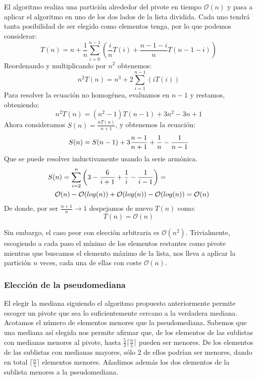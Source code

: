 \documentclass[a4paper, 11pt]{article} %
\begin{document}
      El algoritmo realiza una partición alrededor del pivote en tiempo $\mathcal{O}(n)$ y pasa a aplicar el algoritmo
      en uno de los dos lados de la lista dividida. Cada uno tendrá tanta posibilidad de ser elegido como elementos tenga,
      por lo que podemos considerar:
      \begin{equation}
	T(n) = n + \frac{1}{n}\sum_{i=0}^{n-1}\left( \frac{i}{n}T(i) + \frac{n-1-i}{n}T(n-1-i) \right)
      \end{equation}
      Reordenando y multiplicando por $n^2$ obtenemos:
      \begin{equation}
        n^2T(n) = n^3 + 2\sum^{n-1}_{i=1} \left( i T(i) \right)
      \end{equation}
      Para resolver la ecuación no homogénea, evaluamos en $n-1$ y restamos, obteniendo:
      \begin{equation}
        n^2T(n) = (n^2-1)T(n-1) + 3n^2 - 3n + 1
      \end{equation}
      Ahora consideramos $S(n) = \frac{nT(n)}{n+1}$, y obtenemos la ecuación:
      \begin{equation}
        S(n) = S(n-1) + 3\frac{n-1}{n+1} + \frac{1}{n} - \frac{1}{n-1} \\
      \end{equation}
      Que se puede resolver inductivamente usando la serie armónica.
      \begin{eqnarray}
        \lefteqn{S(n) = \sum_{i=2}^n{\left( 3 - \frac{6}{i+1} + \frac{1}{i} - \frac{1}{i-1} \right)} = }\\ 
        &&\mathcal{O}(n) - \mathcal{O}(log(n)) + \mathcal{O}(log(n)) - \mathcal{O}(log(n)) = \mathcal{O}(n)
      \end{eqnarray}
      De donde, por ser $\frac{n+1}{n}\longrightarrow 1$ despejamos de nuevo $T(n)$ como:
      \begin{equation}
        T(n) =  \mathcal{O}(n)
      \end{equation}

      Sin embargo, el caso peor con elección arbitraria es $\mathcal{O}(n^2)$. Trivialmente, escogiendo a cada paso el mínimo de los elementos restantes como pivote
      mientras que buscamos el elemento máximo de la lista, nos lleva a aplicar la partición $n$ veces, cada una de ellas con coste $\mathcal{O}(n)$.
    
    \subsubsection{Elección de la pseudomediana}
      El elegir la mediana siguiendo el algoritmo propuesto anteriormente permite escoger un pivote que sea lo suficientemente cercano a la verdadera mediana.
      Acotamos el número de elementos menores que la pseudomediana. Sabemos que una mediana así elegida nos permite afirmar que, de los elementos de las sublistas
      con medianas menores al pivote, hasta $\frac{5}{2} \lceil \frac{n}{5} \rceil$ pueden ser menores. De los elementos de las sublistas con medianas mayores,
      sólo 2 de ellos podrían ser menores, dando en total $ \lceil \frac{n}{5} \rceil$ elementos menores. Añadimos además los dos elementos de la sublista menores a la pseudomediana.
      
\end{document}
